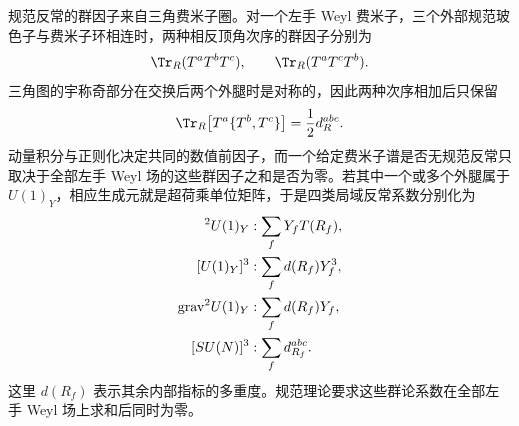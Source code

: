 \begin{derivation}[一代费米子的规范反常抵消]
规范反常的群因子来自三角费米子圈。对一个左手 Weyl 费米子，三个外部规范玻色子与费米子环相连时，两种相反顶角次序的群因子分别为
\begin{equation*}
 \Tr_R(T^aT^bT^c),
 \qquad
 \Tr_R(T^aT^cT^b).
\end{equation*}
三角图的宇称奇部分在交换后两个外腿时是对称的，因此两种次序相加后只保留
\begin{equation*}
 \Tr_R\!\left[T^a\{T^b,T^c\}\right]
 =\frac12d_R^{abc}.
\end{equation*}
动量积分与正则化决定共同的数值前因子，而一个给定费米子谱是否无规范反常只取决于全部左手 Weyl 场的这些群因子之和是否为零。若其中一个或多个外腿属于 $U(1)_Y$，相应生成元就是超荷乘单位矩阵，于是四类局域反常系数分别化为
\begin{align*}
 [SU(N)]^2U(1)_Y &: \sum_f Y_fT(R_f),\\
 [U(1)_Y]^3 &: \sum_f d(R_f)Y_f^3,\\
 {\rm grav}^2U(1)_Y &: \sum_f d(R_f)Y_f,\\
 [SU(N)]^3 &: \sum_f d_{R_f}^{abc}.
\end{align*}
这里 $d(R_f)$ 表示其余内部指标的多重度。规范理论要求这些群论系数在全部左手 Weyl 场上求和后同时为零。


\end{derivation}
